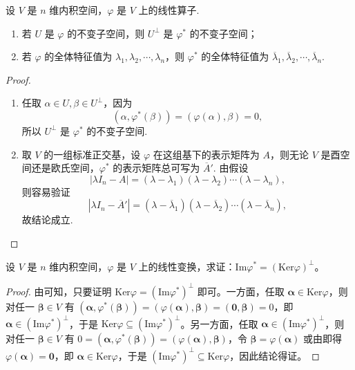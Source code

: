 \documentclass[../../main.tex]{subfiles}
\begin{document}
\begin{proposition}\label{proposition:线性算子的正交补空间就是伴随算子的不变子空间}
设 $V$ 是 $n$ 维内积空间，$\varphi$ 是 $V$ 上的线性算子.
\begin{enumerate}[(1)]
\item 若 $U$ 是 $\varphi$ 的不变子空间，则 $U^{\perp}$ 是 $\varphi^*$ 的不变子空间；

\item 若 $\varphi$ 的全体特征值为 $\lambda_1,\lambda_2,\cdots,\lambda_n$，则 $\varphi^*$ 的全体特征值为 $\overline{\lambda}_1,\overline{\lambda}_2,\cdots,\overline{\lambda}_n$.
\end{enumerate}
\end{proposition}
\begin{proof}
\begin{enumerate}[(1)]
\item 任取 $\alpha \in U, \beta \in U^{\perp}$，因为
\[
(\alpha,\varphi^*(\beta)) = (\varphi(\alpha),\beta) = 0,
\]
所以 $U^{\perp}$ 是 $\varphi^*$ 的不变子空间.

\item 取 $V$ 的一组标准正交基，设 $\varphi$ 在这组基下的表示矩阵为 $A$，则无论 $V$ 是酉空间还是欧氏空间，$\varphi^*$ 的表示矩阵总可写为 $\overline{A}'$. 由假设
\[
|\lambda I_n - A| = (\lambda - \lambda_1)(\lambda - \lambda_2)\cdots(\lambda - \lambda_n),
\]
则容易验证
\[
|\lambda I_n - \overline{A}'| = (\lambda - \overline{\lambda}_1)(\lambda - \overline{\lambda}_2)\cdots(\lambda - \overline{\lambda}_n),
\]
故结论成立.
\end{enumerate}
\end{proof}

\begin{proposition}\label{proposition:例9.27}
设 $V$ 是 $n$ 维内积空间，$\varphi$ 是 $V$ 上的线性变换，求证：$\mathrm{Im}\varphi^* = (\mathrm{Ker}\varphi)^\perp$。
\end{proposition}
\begin{proof}
由可知，只要证明 $\mathrm{Ker}\varphi = (\mathrm{Im}\varphi^*)^\perp$ 即可。一方面，任取 $\boldsymbol{\alpha} \in \mathrm{Ker}\varphi$，则对任一 $\boldsymbol{\beta} \in V$ 有 $(\boldsymbol{\alpha}, \varphi^*(\boldsymbol{\beta})) = (\varphi(\boldsymbol{\alpha}), \boldsymbol{\beta}) = (\boldsymbol{0}, \boldsymbol{\beta}) = 0$，即 $\boldsymbol{\alpha} \in (\mathrm{Im}\varphi^*)^\perp$，于是 $\mathrm{Ker}\varphi \subseteq (\mathrm{Im}\varphi^*)^\perp$。另一方面，任取 $\boldsymbol{\alpha} \in (\mathrm{Im}\varphi^*)^\perp$，则对任一 $\boldsymbol{\beta} \in V$ 有 $0 = (\boldsymbol{\alpha}, \varphi^*(\boldsymbol{\beta})) = (\varphi(\boldsymbol{\alpha}), \boldsymbol{\beta})$，令 $\boldsymbol{\beta} = \varphi(\boldsymbol{\alpha})$ 或由即得 $\varphi(\boldsymbol{\alpha}) = \boldsymbol{0}$，即 $\boldsymbol{\alpha} \in \mathrm{Ker}\varphi$，于是 $(\mathrm{Im}\varphi^*)^\perp \subseteq \mathrm{Ker}\varphi$，因此结论得证。
\end{proof}
\end{document}
